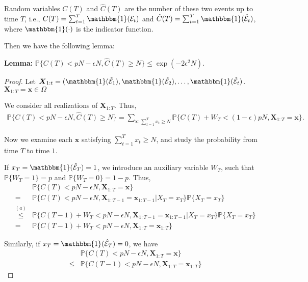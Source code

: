 Random variables $C(T)$ and $\hat{C}(T)$ are the number of these two events up to time $T$, i.e., $C(T) = \sum_{t = 1}^T \mathbbm{1}(\mathcal{E}_{t})$ and $\hat{C}(T) = \sum_{t = 1}^T \mathbbm{1}(\hat{\mathcal{E}}_{t})$, where $\mathbbm{1}(\cdot)$ is the indicator function.

Then we have the following lemma:

\textbf{Lemma:} $\mathbb{P}\{C(T) < pN - \epsilon N, \hat{C}(T) \geq N\} \leq \exp(-2\epsilon^2 N)$.

\begin{proof}


Let $\boldsymbol{X}_{1:t} = (\mathbbm{1}(\hat{\mathcal{E}}_{1}), \mathbbm{1}(\hat{\mathcal{E}}_{2}), \ldots, \mathbbm{1}(\hat{\mathcal{E}}_{t})$. $\boldsymbol{X}_{1:T} = \boldsymbol{x} \in {\Omega}$

We consider all realizations of $\boldsymbol{X}_{1:T}$. Thus,
\begin{eqnarray}
\mathbb{P}\{C(T) < pN - \epsilon N, \hat{C}(T) \geq N\} = \sum_{\boldsymbol{x}: \sum_{t=1}^T x_t \geq N} \mathbb{P}\{C(T) + W_T < (1-\epsilon)pN, \boldsymbol{X}_{1:T} = \boldsymbol{x}\}.
\end{eqnarray}

Now we examine each  $\boldsymbol{x}$ satisfying $\sum_{t=1}^T x_t \geq N$, and study the probability from time $T$ to time $1$.

If $x_T = \mathbbm{1}(\hat{\mathcal{E}}_T) = 1$, we introduce an auxiliary variable $W_T$, such that $\mathbb{P}\{W_T = 1\} = p$ and $\mathbb{P}\{W_T = 0\} = 1-p$.  Thus,
\begin{eqnarray}
&&\mathbb{P}\{C(T) < pN - \epsilon N, \boldsymbol{X}_{1:T} = \boldsymbol{x}\} \nonumber\\
&= & \mathbb{P}\{C(T)  < pN - \epsilon N, \boldsymbol{X}_{1:T-1} = \boldsymbol{x}_{1:T-1}|X_T = x_T \} \mathbb{P}\{X_T = x_T\}\nonumber \\
&\overset{(a)}{\leq} & \mathbb{P}\{C(T-1) + W_T  < pN - \epsilon N, \boldsymbol{X}_{1:T-1} = \boldsymbol{x}_{1:T-1}|X_T = x_T \} \mathbb{P}\{X_T = x_T\} \nonumber\\
& = &\mathbb{P}\{C(T-1) + W_T  < pN - \epsilon N, \boldsymbol{X}_{1:T} = \boldsymbol{x}_{1:T} \}
\end{eqnarray}


Similarly, if $x_T = \mathbbm{1}(\hat{\mathcal{E}}_T) = 0$, we have
\begin{eqnarray}
&&\mathbb{P}\{C(T) < pN - \epsilon N, \boldsymbol{X}_{1:T} = \boldsymbol{x}\} \nonumber\\
& \leq &\mathbb{P}\{C(T-1)  < pN - \epsilon N, \boldsymbol{X}_{1:T} = \boldsymbol{x}_{1:T}\}
\end{eqnarray}


\end{proof}
